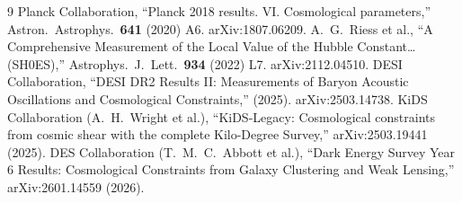 \documentclass[12pt,a4paper,twoside]{article}
\theoremstyle{plain}
\theoremstyle{definition}
\theoremstyle{remark}
\begin{document}
\begin{thebibliography}{9}
Planck Collaboration, ``Planck 2018 results. VI. Cosmological parameters,'' Astron.\ Astrophys.\ \textbf{641} (2020) A6. arXiv:1807.06209.
A.~G.~Riess et al., ``A Comprehensive Measurement of the Local Value of the Hubble Constant\ldots (SH0ES),'' Astrophys.\ J.\ Lett.\ \textbf{934} (2022) L7. arXiv:2112.04510.
DESI Collaboration, ``DESI DR2 Results II: Measurements of Baryon Acoustic Oscillations and Cosmological Constraints,'' (2025). arXiv:2503.14738.
KiDS Collaboration (A.~H.~Wright et al.), ``KiDS-Legacy: Cosmological constraints from cosmic shear with the complete Kilo-Degree Survey,'' arXiv:2503.19441 (2025).
DES Collaboration (T.~M.~C.~Abbott et al.), ``Dark Energy Survey Year 6 Results: Cosmological Constraints from Galaxy Clustering and Weak Lensing,'' arXiv:2601.14559 (2026).

\end{thebibliography}
\end{document}
